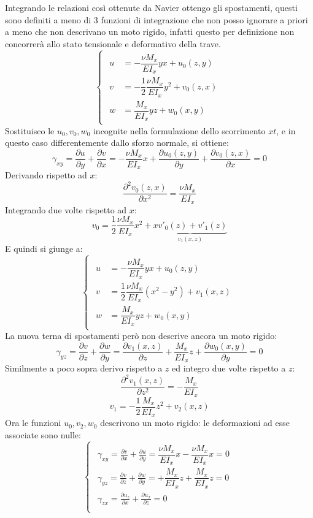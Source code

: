 		Integrando le relazioni così ottenute da Navier ottengo gli spostamenti, questi sono definiti a meno di 3 funzioni di integrazione che non posso ignorare a priori a meno che non descrivano un moto rigido, infatti questo per definizione non concorrerà allo stato tensionale e deformativo della trave.
		\[ \begin{cases}
			\begin{aligned}
				u & = -\dfrac{\nu M_x}{EI_x}yx + u_0(z,y) \\
				v & = -\dfrac{1}{2}\dfrac{\nu M_x}{EI_x}y^2 + v_0(z,x) \\
				w & = \dfrac{M_x}{EI_x}yz + w_0(x,y)
			\end{aligned}
		\end{cases} \]
		Sostituisco le $ u_0,  v_0,  w_0$ incognite nella formulazione dello scorrimento $xt$, e in questo caso differentemente dallo sforzo normale, si ottiene:
		\[ 	\gamma_{xy} =   \frac{\partial u}{\partial y} + \dfrac{\partial v}{\partial x} = -\dfrac{\nu M_x}{EI_x}x + \dfrac{\partial u_0(z,y)}{\partial y} + \dfrac{\partial v_0(z,x)}{\partial x} = 0\] 
		Derivando rispetto ad $x$:
		\[  \dfrac{\partial^2 v_0(z,x)}{\partial x^2} = \dfrac{\nu M_x}{EI_x}  \]
		Integrando due volte rispetto ad $x$:
		\[  v_0 = \dfrac{1}{2}\dfrac{\nu M_x}{EI_x}x^2 + \underbrace{xv'_0(z) + v'_1(z)}_\text{$v_1(x,z)$} \]
		E quindi si giunge a: 
		\[ \begin{cases}
			\begin{aligned}
				u & = -\dfrac{\nu M_x}{EI_x}yx + u_0(z,y) \\
				v & = \dfrac{1}{2}\dfrac{\nu M_x}{EI_x}(x^2 - y^2) + v_1(x,z) \\
				w & = \dfrac{M_x}{EI_x}yz + w_0(x,y)
			\end{aligned}
		\end{cases} \]
		La nuova terna di spostamenti però non descrive ancora un moto rigido:
		\[\gamma_{yz} =   \frac{\partial v}{\partial z} + \frac{\partial w}{\partial y} = \dfrac{\partial v_1(x,z)}{\partial z} + \dfrac{M_x}{EI_x}z +\dfrac{\partial w_0(x,y)}{\partial y} = 0\]
		Similmente a poco sopra derivo rispetto a $z$ ed integro due volte rispetto a $z$: 
		\[  \dfrac{\partial^2 v_1(x,z)}{\partial z^2} = - \dfrac{M_x}{EI_x}  \]
		\[  v_1 = -\dfrac{1}{2}\dfrac{M_x}{EI_x}z^2 + v_2(x,z) \]
		Ora le funzioni $ u_0,  v_2,  w_0$ descrivono un moto rigido: le deformazioni ad esse associate sono nulle:
		\[\begin{cases}
			\begin{aligned}
				\gamma_{xy} =   \frac{\partial v}{\partial x} + \frac{\partial u}{\partial y} = \dfrac{\nu M_x}{EI_x}x - \dfrac{\nu M_x}{EI_x}x  = 0\\
				\gamma_{yz} =   \frac{\partial v}{\partial z} + \frac{\partial w}{\partial y} = + \dfrac{M_x}{EI_x}z + \dfrac{M_x}{EI_x}z = 0 \\
				\gamma_{zx} =   \frac{\partial u_z}{\partial x} + \frac{\partial u_x}{\partial z} = 0 \\
			\end{aligned}\end{cases}\]
		
